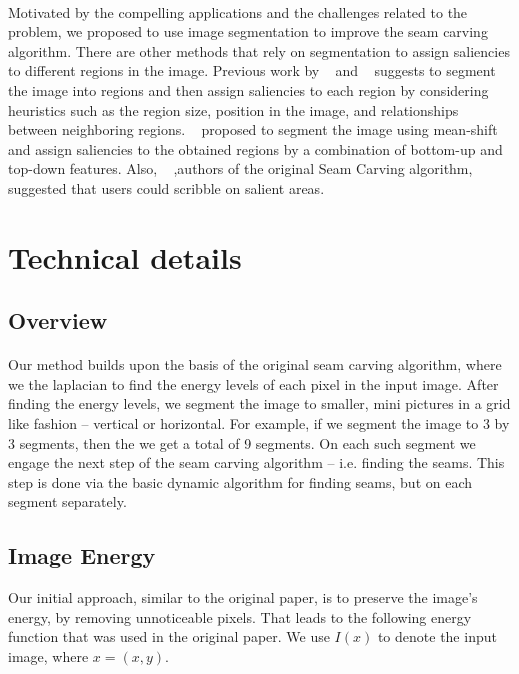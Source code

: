 \documentclass[conference]{acmsiggraph}
\begin{document}
\paragraph{}
Motivated by the compelling applications and the challenges related to the problem, we proposed to use image segmentation to improve the seam carving algorithm. There are other methods that rely on segmentation to assign saliencies to different regions in the image. Previous work by ~\cite{Liu2007} and ~\cite{Hasan2009} suggests to segment the image into regions and then assign saliencies to each region by considering heuristics such as the region size, position in the image, and relationships between neighboring regions. ~\cite{Setlur2005} proposed to segment the image using mean-shift and assign saliencies to the obtained regions by a combination of bottom-up and top-down features. Also, ~\cite{Avidan2007} ,authors of the original Seam Carving algorithm, suggested that users could scribble on salient areas. 

\section{Technical details}

\subsection{Overview}

\paragraph{}
Our method builds upon the basis of the original seam carving algorithm, where we the laplacian to find the energy levels of each pixel in the input image. After finding the energy levels, we segment the image to smaller, mini pictures in a grid like fashion -- vertical or horizontal. For example, if we segment the image to 3 by 3 segments, then the we get a total of 9 segments. On each such segment we engage the next step of the seam carving algorithm -- i.e. finding the seams. This step is done via the basic dynamic algorithm for finding seams, but on each segment separately.

\subsection{Image Energy}
Our initial approach, similar to the original paper, is to preserve the image's energy, by removing unnoticeable pixels. That leads to the following energy function that was used in the original paper. We use $I(x)$ to denote the input image, where $x = (x, y)$. 
\end{document}
